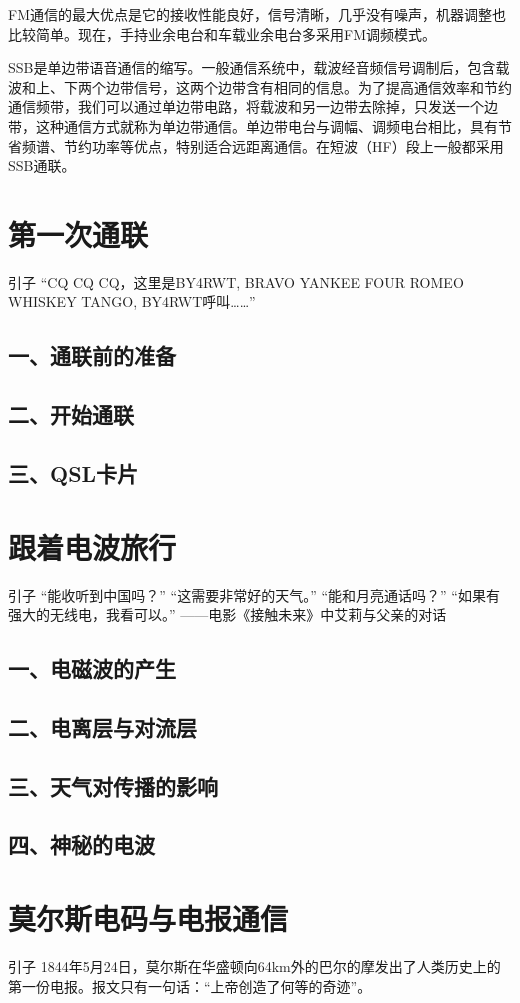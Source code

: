 \documentclass[12pt,UTF8]{ctexbook}
\begin{document}
FM通信的最大优点是它的接收性能良好，信号清晰，几乎没有噪声，机器调整也比较简单。现在，手持业余电台和车载业余电台多采用FM调频模式。

SSB是单边带语音通信的缩写。一般通信系统中，载波经音频信号调制后，包含载波和上、下两个边带信号，这两个边带含有相同的信息。为了提高通信效率和节约通信频带，我们可以通过单边带电路，将载波和另一边带去除掉，只发送一个边带，这种通信方式就称为单边带通信。单边带电台与调幅、调频电台相比，具有节省频谱、节约功率等优点，特别适合远距离通信。在短波（HF）段上一般都采用SSB通联。

\chapter{第一次通联}
引子
“CQ CQ CQ，这里是BY4RWT, BRAVO YANKEE FOUR ROMEO WHISKEY TANGO, BY4RWT呼叫……”
\section{一、通联前的准备}
\section{二、开始通联}
\section{三、QSL卡片}

\chapter{跟着电波旅行}
引子
“能收听到中国吗？”
“这需要非常好的天气。”
“能和月亮通话吗？”
“如果有强大的无线电，我看可以。”
——电影《接触未来》中艾莉与父亲的对话

\section{一、电磁波的产生}
\section{二、电离层与对流层}
\section{三、天气对传播的影响}
\section{四、神秘的电波}

\chapter{莫尔斯电码与电报通信}
引子
1844年5月24日，莫尔斯在华盛顿向64km外的巴尔的摩发出了人类历史上的第一份电报。报文只有一句话：“上帝创造了何等的奇迹”。
\end{document}

